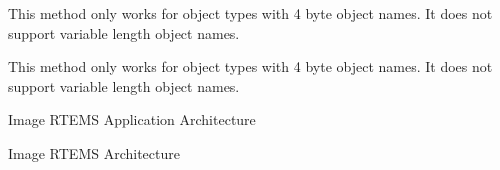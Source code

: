 
\begin{DoxyRefList}
\item[Global \mbox{\hyperlink{group__RTEMSScoreObjectMP_gaee5f1bac6bea600e8f437c6cb0458f97}{\+\_\+\+Objects\+\_\+\+M\+P\+\_\+\+Allocate\+\_\+and\+\_\+open}} (\mbox{\hyperlink{structObjects__Information}{Objects\+\_\+\+Information}} $\ast$information, uint32\+\_\+t the\+\_\+name, Objects\+\_\+\+Id the\+\_\+id, bool is\+\_\+fatal\+\_\+error)]\label{todo__todo000008}%
%
This method only works for object types with 4 byte object names. It does not support variable length object names.  
\item[Global \mbox{\hyperlink{group__RTEMSScoreObjectMP_gaa5c13d3459c22165867d079319392ee6}{\+\_\+\+Objects\+\_\+\+M\+P\+\_\+\+Open}} (\mbox{\hyperlink{structObjects__Information}{Objects\+\_\+\+Information}} $\ast$information, Objects\+\_\+\+M\+P\+\_\+\+Control $\ast$the\+\_\+global\+\_\+object, uint32\+\_\+t the\+\_\+name, Objects\+\_\+\+Id the\+\_\+id)]\label{todo__todo000007}%
%
This method only works for object types with 4 byte object names. It does not support variable length object names.  
\item[Page \mbox{\hyperlink{RTEMSOverview}{R\+T\+E\+MS Overview}} ]\label{todo__todo000003}%
%
Image R\+T\+E\+MS Application Architecture

\label{todo__todo000004}%
%
Image R\+T\+E\+MS Architecture


\end{DoxyRefList}
